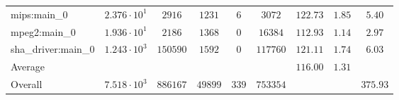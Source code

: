 \begin{tabular}{|l|c|c|c|c|c|c|c|c|}
mips:main\_0            & $ 2.376 \cdot 10^{1} $ & $ 2916   $ & $ 1231  $ & $ 6   $ & $ 3072   $ & $ 122.73      $ & $ 1.85    $ & $ 5.40    $ \\
mpeg2:main\_0           & $ 1.936 \cdot 10^{1} $ & $ 2186   $ & $ 1368  $ & $ 0   $ & $ 16384  $ & $ 112.93      $ & $ 1.14    $ & $ 2.97    $ \\
sha\_driver:main\_0     & $ 1.243 \cdot 10^{3} $ & $ 150590 $ & $ 1592  $ & $ 0   $ & $ 117760 $ & $ 121.11      $ & $ 1.74    $ & $ 6.03    $ \\
\hline
Average                 & $                    $ & $        $ & $       $ & $     $ & $        $ & $ 116.00      $ & $ 1.31    $ & $         $ \\
\hline
Overall                 & $ 7.518 \cdot 10^{3} $ & $ 886167 $ & $ 49899 $ & $ 339 $ & $ 753354 $ & $             $ & $         $ & $ 375.93  $ \\
\hline
\end{tabular}
